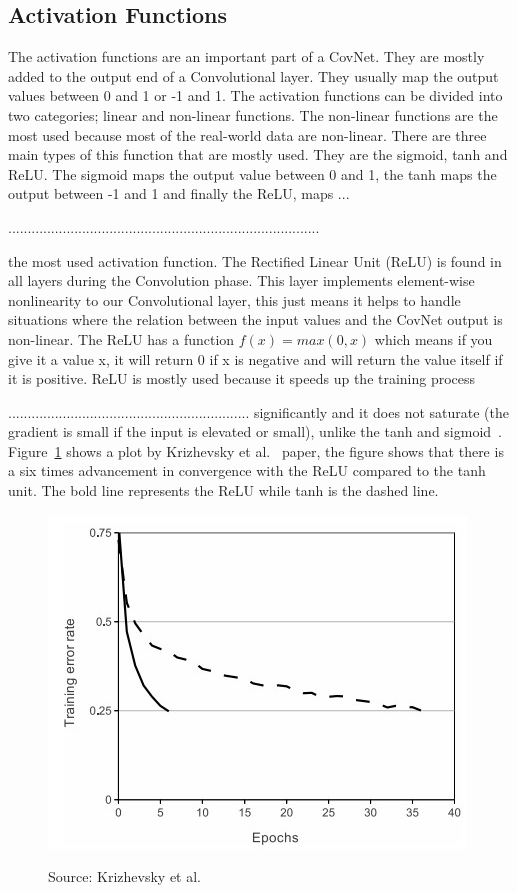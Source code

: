 \documentclass[12pt, a4paper,oneside]{report}
\newcommand{\source}[1]{\vspace{-3pt} \caption*{ Source: {#1}} }
\begin{document}
\subsection{Activation Functions}
The activation functions are an important part of a CovNet. They are mostly added to the output end of a Convolutional layer. They usually map the output values between 0 and 1 or -1 and 1. The activation functions can be divided into two categories; linear and non-linear functions. The non-linear functions are the most used because most of the real-world data are non-linear. There are three main types of this function that are mostly used. They are the sigmoid, tanh and ReLU. The sigmoid maps the output value between 0 and 1, the tanh maps the output between -1 and 1 and finally the ReLU, maps ...

................................................................................


 the most used activation function. The Rectified Linear Unit (ReLU) is found in all layers during the Convolution phase. This layer implements element-wise nonlinearity to our Convolutional layer, this just means it helps to handle situations where the relation between the input values and the CovNet output is non-linear. The ReLU has a function \(f(x) = max(0,x)\) which means if you give it a value x, it will return 0 if x is negative and will return the value itself if it is positive. ReLU is mostly used because it speeds up the training process
 
.............................................................. 
significantly and it does not saturate (the gradient is small if the input is elevated or small), unlike the tanh and sigmoid~\cite{relu}. Figure~\ref{fig:relu} shows a plot by Krizhevsky et al.~\cite{krizhevsky2012imagenet} paper, the figure shows that there is a six times advancement in convergence with the ReLU compared to the tanh unit. The bold line represents the ReLU while tanh is the dashed line.

\begin{figure}
	\includegraphics [scale=0.9] {relu}
	\label{fig:relu}
	\source{Krizhevsky et al.~\cite{krizhevsky2012imagenet}}
\end{figure}
\end{document}
